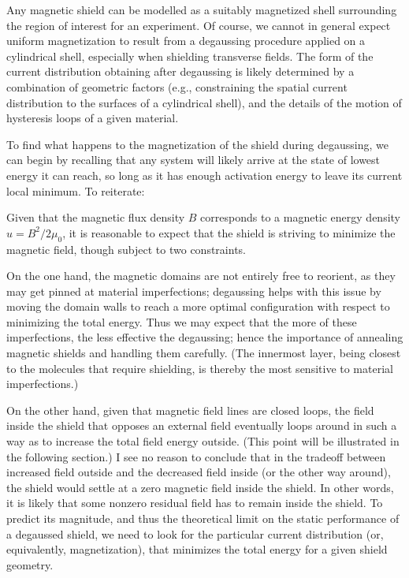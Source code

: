 Any magnetic shield can be modelled as a suitably magnetized shell surrounding
the region of interest for an experiment. Of course, we cannot in general expect
uniform magnetization to result from a degaussing procedure applied on a
cylindrical shell, especially when shielding transverse fields. The form of the
current distribution obtaining after degaussing is likely determined by a
combination of geometric factors (e.g., constraining the spatial current
distribution to the surfaces of a cylindrical shell), and the details of the
motion of hysteresis loops of a given material.

To find what happens to the magnetization of the shield during degaussing, we
can begin by recalling that any system will likely arrive at the state of lowest
energy it can reach, so long as it has enough activation energy to leave its
current local minimum. To reiterate:

\vspace{1em}

\label{framed_principle}
\noindent{}

\vspace{1em}

Given that the magnetic flux density $B$ corresponds to a
magnetic energy density $u=B^2/2\mu_0$, it is reasonable to expect that the
shield is striving to minimize the magnetic field, though subject to two
constraints.

On the one hand, the magnetic domains are not entirely free to reorient, as they
may get pinned at material imperfections; degaussing helps with this issue by
moving the domain walls to reach a more optimal configuration with respect to
minimizing the total energy. Thus we may expect that the more of these
imperfections, the less effective the degaussing; hence the importance of
annealing magnetic shields and handling them carefully. (The innermost layer,
being closest to the molecules that require shielding, is thereby the most
sensitive to material imperfections.)

On the other hand, given that magnetic field lines are closed loops, the field
inside the shield that opposes an external field eventually loops around in such
a way as to increase the total field energy outside. (This point will be
illustrated in the following section.) I see no reason to conclude that in the
tradeoff between increased field outside and the decreased field inside (or the
other way around), the shield would settle at a zero magnetic field inside the
shield. In other words, it is likely that some nonzero residual field has to
remain inside the shield.  To predict its magnitude, and thus the theoretical
limit on the static performance of a degaussed shield, we need to look for the
particular current distribution (or, equivalently, magnetization), that
minimizes the total energy for a given shield geometry.

